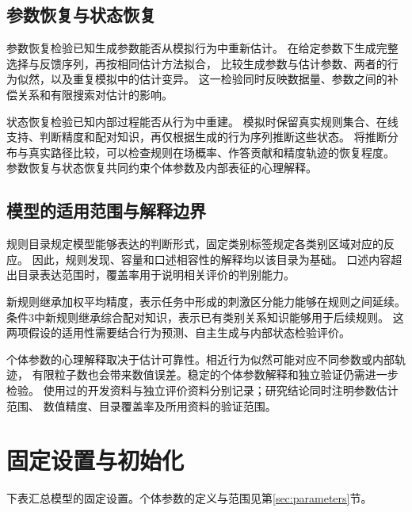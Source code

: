 \documentclass[11pt,a4paper]{article}
\numberwithin{equation}{section}
\begin{document}
\subsection{参数恢复与状态恢复}
参数恢复检验已知生成参数能否从模拟行为中重新估计。
在给定参数下生成完整选择与反馈序列，再按相同估计方法拟合，
比较生成参数与估计参数、两者的行为似然，以及重复模拟中的估计变异。
这一检验同时反映数据量、参数之间的补偿关系和有限搜索对估计的影响。

状态恢复检验已知内部过程能否从行为中重建。
模拟时保留真实规则集合、在线支持、判断精度和配对知识，再仅根据生成的行为序列推断这些状态。
将推断分布与真实路径比较，可以检查规则在场概率、作答贡献和精度轨迹的恢复程度。
参数恢复与状态恢复共同约束个体参数及内部表征的心理解释。

\subsection{模型的适用范围与解释边界}
规则目录规定模型能够表达的判断形式，固定类别标签规定各类别区域对应的反应。
因此，规则发现、容量和口述相容性的解释均以该目录为基础。
口述内容超出目录表达范围时，覆盖率用于说明相关评价的判别能力。

新规则继承加权平均精度，表示任务中形成的刺激区分能力能够在规则之间延续。
条件3中新规则继承综合配对知识，表示已有类别关系知识能够用于后续规则。
这两项假设的适用性需要结合行为预测、自主生成与内部状态检验评价。

个体参数的心理解释取决于估计可靠性。相近行为似然可能对应不同参数或内部轨迹，
有限粒子数也会带来数值误差。稳定的个体参数解释和独立验证仍需进一步检验。
使用过的开发资料与独立评价资料分别记录；研究结论同时注明参数估计范围、
数值精度、目录覆盖率及所用资料的验证范围。

\appendix
\section{固定设置与初始化}
\label{app:settings}

下表汇总模型的固定设置。个体参数的定义与范围见第\ref{sec:parameters}节。
\end{document}

